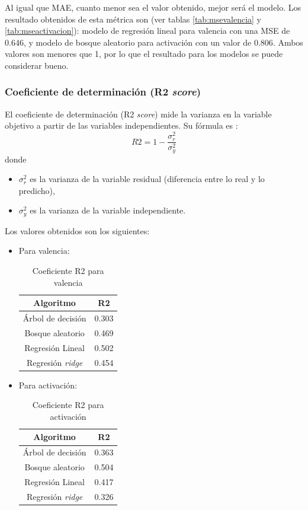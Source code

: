 \documentclass[12pt,a4paper]{article}
\begin{document}
Al igual que MAE, cuanto menor sea el valor obtenido, mejor será el modelo. Los resultado obtenidos de esta métrica son (ver tablas \ref{tab:msevalencia} y \ref{tab:mseactivacion}): modelo de regresión lineal para valencia con una MSE de 0.646, y modelo de bosque aleatorio para activación con un valor de 0.806. Ambos valores son menores que 1, por lo que el resultado para los modelos se puede considerar bueno. 

\subsubsection{Coeficiente de determinación (R2 \textit{score})}
El coeficiente de determinación (R2 \textit{score}) mide la varianza en la variable objetivo a partir de las variables independientes. Su fórmula es \cite{eswiki:158364923}:
\begin{equation}
	R2 = 1 - \frac{\sigma^{2}_r}{\sigma^{2}_y} 
\end{equation}
donde
\begin{itemize}
	\item $\sigma^{2}_r$ es la varianza de la variable residual (diferencia entre lo real y lo predicho),
	\item $\sigma^{2}_y$ es la varianza de la variable independiente.
\end{itemize}

Los valores obtenidos son los siguientes:
\begin{itemize}
	\item Para valencia:
	\begin{table}[H]
		\centering
		\caption{Coeficiente R2 para valencia}
		\label{tab:r2valencia}
		\begin{tabular}{|c|c|}
			\hline
			\textbf{Algoritmo} & \textbf{R2} \\
			\hline
			Árbol de decisión & 0.303 \\
			Bosque aleatorio & 0.469 \\
			Regresión Lineal & 0.502 \\
			Regresión \textit{ridge} & 0.454 \\
			\hline
		\end{tabular}
	\end{table}
	\item Para activación:
	\begin{table}[H]
		\centering
		\caption{Coeficiente R2 para activación}
		\label{tab:r2activacion}
		\begin{tabular}{|c|c|}
			\hline
			\textbf{Algoritmo} & \textbf{R2} \\
			\hline
			Árbol de decisión & 0.363 \\
			Bosque aleatorio & 0.504 \\
			Regresión Lineal & 0.417 \\
			Regresión \textit{ridge} & 0.326 \\
			\hline
		\end{tabular}
	\end{table}
\end{itemize}
\end{document}
